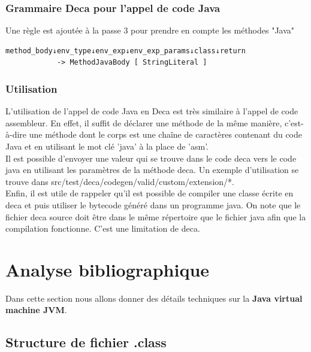 \documentclass[12pt, a4paper, one side]{article}
\begin{document}
    \subsubsection{Grammaire Deca pour l'appel de code Java}
    Une règle est ajoutée à la passe 3 pour prendre en compte les méthodes "Java"
    \begin{lstlisting}
method_body↓env_type↓env_exp↓env_exp_params↓class↓return
            -> MethodJavaBody [ StringLiteral ]
    \end{lstlisting}

    \subsubsection{Utilisation}
    L'utilisation de l'appel de code Java en Deca est très similaire à l'appel de code assembleur. En effet, il suffit de déclarer une méthode de la même manière, c'est-à-dire une méthode dont le corps est une chaîne de caractères contenant du code Java et en utilisant le mot clé 'java' à la place de 'asm'.
    \\

    Il est possible d'envoyer une valeur qui se trouve dans le code deca vers le code java en utilisant les paramètres de la méthode deca. Un exemple d'utilisation se trouve dans src/test/deca/codegen/valid/custom/extension/*.
    \\

    Enfin, il est utile de rappeler qu'il est possible de compiler une classe écrite en deca et puis utiliser le bytecode généré dans un programme java. On note que le fichier deca source doit être dans le même répertoire que le fichier java afin que la compilation fonctionne. C'est une limitation de deca.

    \section{Analyse bibliographique}
    Dans cette section nous allons donner des détails techniques sur la  \textbf{Java virtual machine JVM}.

    \subsection{Structure de fichier .class}
\end{document}
